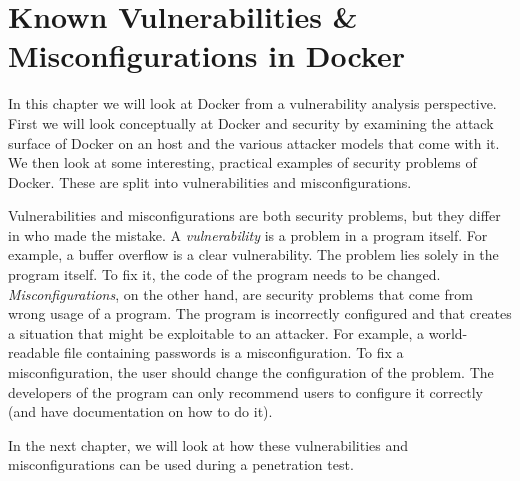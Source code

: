 \chapter{Known Vulnerabilities \& Misconfigurations in Docker}
In this chapter we will look at Docker from a vulnerability analysis perspective. First we will look conceptually at Docker and security by examining the attack surface of Docker on an host and the various attacker models that come with it.
We then look at some interesting, practical examples of security problems of Docker. These are split into vulnerabilities and misconfigurations.

\hfill

Vulnerabilities and misconfigurations are both security problems, but they differ in who made the mistake. A \emph{vulnerability} is a problem in a program itself. For example, a buffer overflow is a clear vulnerability. The problem lies solely in the program itself. To fix it, the code of the program needs to be changed. \emph{Misconfigurations}, on the other hand, are security problems that come from wrong usage of a program. The program is incorrectly configured and that creates a situation that might be exploitable to an attacker. For example, a world-readable file containing passwords is a misconfiguration. To fix a misconfiguration, the user should change the configuration of the problem. The developers of the program can only recommend users to configure it correctly (and have documentation on how to do it).

\hfill

In the next chapter, we will look at how these vulnerabilities and misconfigurations can be used during a penetration test.




